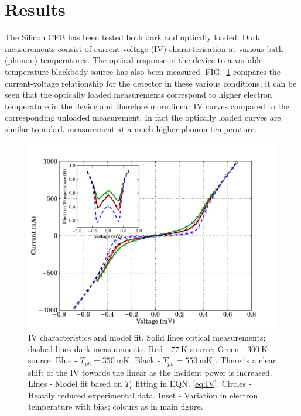 \documentclass[aip, apl, a4paper, amsmath,amssymb, reprint]{revtex4-1}
\begin{document}
\section{Results} \label{sec:Results}
The Silicon CEB has been tested both dark and optically loaded. Dark measurements consist of current-voltage (IV) characterisation at various bath (phonon) temperatures. The optical response of the device to a variable temperature blackbody source has also been measured. FIG.~\ref{fig:IV_data_model} compares the current-voltage relationship for the detector in these various conditions; it can be seen that the optically loaded measurements correspond to higher electron temperature in the device and therefore more linear IV curves compared to the corresponding unloaded measurement. In fact the optically loaded curves are similar to a dark measurement at a much higher phonon temperature.
\begin{figure}[ht]
\includegraphics[width = 0.8\columnwidth]{01_IVs_APL}
\caption{IV characteristics and model fit. Solid lines optical measurements; dashed lines dark measurements. Red - $77~\mathrm{K}$ source; Green - $300~\mathrm{K}$ source; Blue - $T_{ph} = 350~\mathrm{mK}$; Black - $T_{ph} = 550~\mathrm{mK}$ . There is a clear shift of the IV towards the linear as the incident power is increased. Lines - Model fit based on $T_{e}$ fitting in EQN. \ref{eq:IV}. Circles - Heavily reduced experimental data. Inset - Variation in electron temperature with bias; colours as in main figure.}
\label{fig:IV_data_model}
\end{figure}
\end{document}

